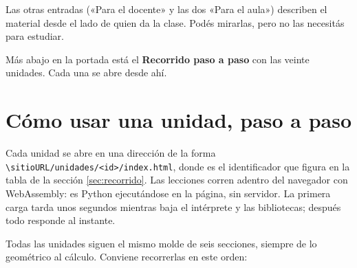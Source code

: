 \documentclass[11pt,a4paper]{report}
\newcommand{\clave}[1]{\texttt{\detokenize{#1}}}
\begin{document}
Las otras entradas («Para el docente» y las dos «Para el aula») describen el material desde el lado de quien da la clase. Podés mirarlas, pero no las necesitás para estudiar.

Más abajo en la portada está el \textbf{Recorrido paso a paso} con las veinte unidades. Cada una se abre desde ahí.

\section{Cómo usar una unidad, paso a paso}\label{sec:unidad}

Cada unidad se abre en una dirección de la forma \expandafter\nolinkurl\expandafter{\sitioURL/unidades/<id>/index.html}, donde \clave{<id>} es el identificador que figura en la tabla de la sección \ref{sec:recorrido}. Las lecciones corren adentro del navegador con WebAssembly: es Python ejecutándose en la página, sin servidor. La primera carga tarda unos segundos mientras baja el intérprete y las bibliotecas; después todo responde al instante.

Todas las unidades siguen el mismo molde de seis secciones, siempre de lo geométrico al cálculo. Conviene recorrerlas en este orden:
\end{document}
